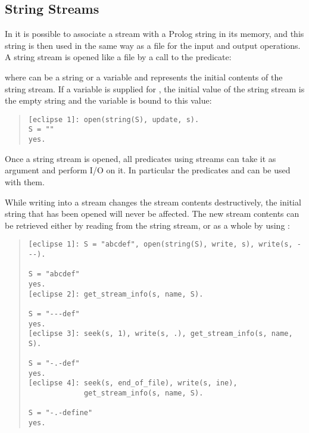 \subsection{String Streams}
\label{stringio}
In {\eclipse} it is possible to associate a stream with a Prolog string
in its memory, and this string is then used in the same way as a file
for the input and output operations.
A string stream is opened like a file by a call to the
 predicate:
\begin{quote}
\end{quote}
where  can be a {\eclipse} string or a variable and represents
the initial contents of the string stream.
If a variable is supplied for , the initial value of the
string
stream is the empty string and the variable is bound to this value:
\begin{quote}
\begin{verbatim}
[eclipse 1]: open(string(S), update, s).
S = ""
yes.
\end{verbatim}
\end{quote}
Once a string stream is opened, all predicates using streams
can take it as argument and perform I/O on it.
In particular the predicates
 and
can be used with them.

While writing into a stream changes the stream contents destructively,
the initial string that has been opened will never be affected.
The new stream contents can be retrieved either by reading from the string
stream, or as a whole by using
:
\begin{quote}
\begin{verbatim}
[eclipse 1]: S = "abcdef", open(string(S), write, s), write(s, ---).

S = "abcdef"
yes.
[eclipse 2]: get_stream_info(s, name, S).

S = "---def"
yes.
[eclipse 3]: seek(s, 1), write(s, .), get_stream_info(s, name, S).

S = "-.-def"
yes.
[eclipse 4]: seek(s, end_of_file), write(s, ine),
             get_stream_info(s, name, S).

S = "-.-define"
yes.
\end{verbatim}
\end{quote}



